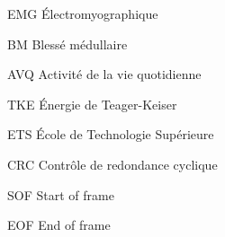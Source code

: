 \documentclass[letterpaper, twoside, 12pt, memoire, creativecommons, hyperref]{thETS}
\begin{document}
\tableofcontents

\listoftables

\listoffigures

\begin{listofabbr}[3cm]
\item [EMG] Électromyographique
\item [BM] Blessé médullaire
\item [AVQ] Activité de la vie quotidienne
\item [TKE] Énergie de Teager-Keiser
\item [ETS] École de Technologie Supérieure
\item [CRC] Contrôle de redondance cyclique
\item [SOF] Start of frame
\item [EOF] End of frame

\end{listofabbr}
\end{document}
